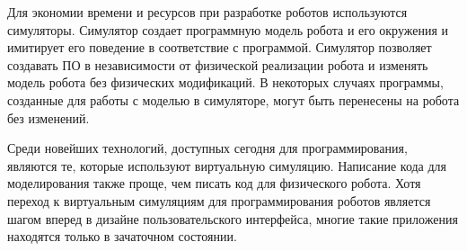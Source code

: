 Для экономии времени и ресурсов при разработке роботов используются симуляторы. Симулятор создает программную модель робота и его окружения и имитирует его поведение в соответствие с программой. Симулятор позволяет создавать ПО в независимости от физической реализации робота и изменять модель робота без физических модификаций. В некоторых случаях программы, созданные для работы с моделью в симуляторе, могут быть перенесены на робота без изменений.

Среди новейших технологий, доступных сегодня для программирования, являются те, которые используют виртуальную симуляцию. Написание кода для моделирования также проще, чем писать код для физического робота. Хотя переход к виртуальным симуляциям для программирования роботов является шагом вперед в дизайне пользовательского интерфейса, многие такие приложения находятся только в зачаточном состоянии.



